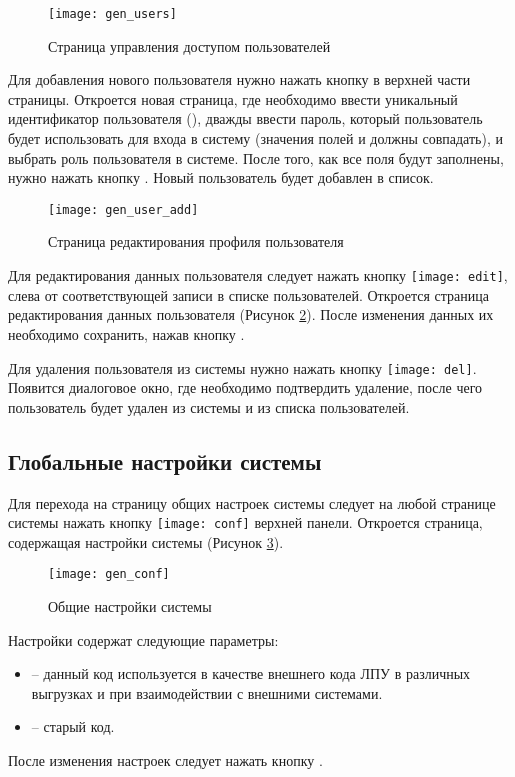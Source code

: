 \begin{figure}[ht]\centering
 \texttt{[image: gen\_users]}
 \caption{Страница управления доступом пользователей}
 \label{img_gen_users}
\end{figure} 

Для добавления нового пользователя нужно нажать кнопку   в верхней части страницы. Откроется новая страница, где необходимо ввести уникальный идентификатор пользователя (), дважды ввести пароль, который пользователь будет использовать для входа в систему (значения полей  и  должны совпадать), и выбрать роль пользователя в системе. После того, как все поля будут заполнены, нужно нажать кнопку . Новый пользователь будет добавлен в список.

\begin{figure}[ht]\centering
 \texttt{[image: gen\_user\_add]}
 \caption{Страница редактирования профиля пользователя}
 \label{img_gen_user_add}
\end{figure}

Для редактирования данных пользователя следует нажать кнопку \texttt{[image: edit]}, слева от соответствующей записи в списке пользователей. Откроется страница редактирования данных пользователя (Рисунок \ref{img_gen_user_add}). После изменения данных их необходимо сохранить, нажав кнопку .

Для удаления пользователя из системы нужно нажать кнопку \texttt{[image: del]}. Появится диалоговое окно, где необходимо подтвердить удаление, после чего пользователь будет удален из системы и из списка пользователей.

\subsection{Глобальные настройки системы} \label{gen_conf}

Для перехода на страницу общих настроек системы следует на любой странице системы нажать кнопку \texttt{[image: conf]}  верхней панели. Откроется страница, содержащая настройки системы (Рисунок \ref{img_gen_conf}).

\begin{figure}[ht]\centering
 \texttt{[image: gen\_conf]}
 \caption{Общие настройки системы}
 \label{img_gen_conf}
\end{figure}

Настройки содержат следующие параметры:
\begin{itemize}
 \item {} – данный код используется в качестве внешнего кода ЛПУ в различных выгрузках и при взаимодействии с внешними системами.
 \item {} – старый код.
\end{itemize}
 
После изменения настроек следует нажать кнопку .
